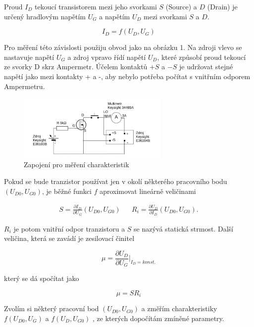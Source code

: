 \documentclass[a4paper,11pt]{article}
\begin{document}
 Proud $ I_D $  tekoucí transistorem mezi jeho svorkami $ S $ (Source) a $ D $ (Drain) je určený hradlovým napětím $ U_G $ a napětím $ U_D $ mezi svorkami $ S $ a $ D $. 

 \begin{equation}
 I_D = f(U_D, U_G)
 \end{equation}

 Pro měření této závislosti použiju obvod jako na obrázku 1. Na zdroji vlevo se nastavuje napětí $ U_G $ a zdroj vpravo řídí napětí $ U_D $, které způsobí proud tekoucí ze svorky D skrz Ampermetr. Účelem kontaktů $ +S $ a $ -S $ je udržovat stejné napětí jako mezi kontakty + a -, aby nebylo potřeba počítat s vnitřním odporem Ampermetru.

\begin{figure}[htpb]
    \centering
    \includegraphics[width=0.65\textwidth]{charakteristiky_schema.jpg}
    \caption{Zapojení pro měření charakteristik}
\end{figure}


 Pokud se bude tranzistor používat jen v okolí některého pracovního bodu $ (U_{D0}, U_{G0}) $, je běžné funkci $ f $ aproximovat lineárně veličinami

\begin{align}
    S = \frac{\partial I_D}{\partial U_G}(U_{D0}, U_{G0}) && R_i = \frac{\partial U_D}{\partial I_D}(U_{D0}, U_{G0}).
\end{align}

$ R_i $  je potom vnitřní odpor tranzistoru a $ S $ se nazývá statická strmost. Další veličina, která se zavádí je zesilovací činitel

\begin{equation}
\mu = \frac{\partial U_D}{\partial U_G} \Big |_{I_D = konst.}
\end{equation}

\noindent
který se dá spočítat jako

\begin{equation}
\mu = S R_i
\end{equation}

Zvolím si některý pracovní bod $ (U_{D0}, U_{G0}) $ a změřím charakteristiky $ f(U_{D0}, U_{G}) $  a $ f(U_{D}, U_{G0}) $ , ze kterých dopočítám zmíněné parametry.
\end{document}
